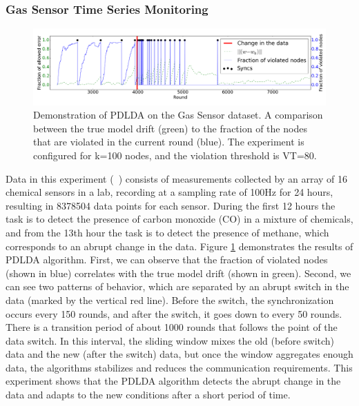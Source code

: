 \documentclass{vldb}
\begin{document}
\subsubsection{Gas Sensor Time Series Monitoring}
\begin{figure}[ht]
\centering
\includegraphics[width=\textwidth]{BigGas/overTime100k.png}
\caption{Demonstration of PDLDA on the Gas Sensor dataset.
A comparison between the true model drift (green) to the fraction of the nodes that
are violated in the current round (blue).
The experiment is configured for k=100 nodes, and the violation threshold is
VT=80.}
\label{BigGasOverTime}
\end{figure}
Data in this experiment (~\citealt{bigGas}) consists of measurements collected
by an array of 16 chemical sensors in a lab, recording at a sampling
rate of 100Hz for 24 hours, resulting in 8378504 data points for each sensor.
During the first 12 hours the task is to detect the presence of carbon monoxide
(CO) in a mixture of chemicals, and from the 13th hour the task is to detect the presence of methane, 
which corresponds to an abrupt change in the data.
Figure \ref{BigGasOverTime} demonstrates the results of PDLDA algorithm.
First, we can observe that the fraction of violated nodes (shown in blue) correlates with the true model drift (shown in green). Second, we can see two patterns of behavior, which are separated by an abrupt switch in the data  (marked by the vertical red line). Before the switch,  the synchronization occurs every 150 rounds, and after the switch, it goes down to every 50 rounds. There is a transition period of about 1000 rounds that follows the point of the data switch. In this interval, the sliding window mixes the old (before switch) data and the new (after the switch) data, but once the window aggregates enough data, the algorithms stabilizes and reduces the communication requirements.   This experiment shows that the PDLDA algorithm detects the abrupt change in the data and adapts to the new conditions after a short period of time.
\end{document}
